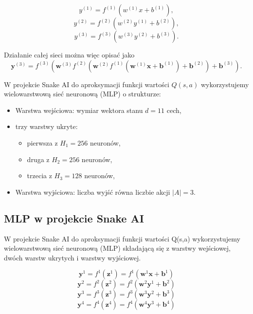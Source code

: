 \documentclass[a4paper,12pt]{article}
\begin{document}
\begin{equation}
y^{(1)} = f^{(1)}\left(w^{(1)}x + b^{(1)}\right), 
\end{equation}
\begin{equation}
y^{(2)} = f^{(2)}\left(w^{(2)}y^{(1)} + b^{(2)}\right), 
\end{equation}
\begin{equation}
y^{(3)} = f^{(3)}\left(w^{(3)}y^{(2)} + b^{(3)}\right).
\end{equation} 

Działanie całej sieci można więc opisać jako
\begin{equation}
\mathbf{y}^{(3)} = f^{(3)}\left( \mathbf{w}^{(3)} f^{(2)}\left( \mathbf{w}^{(2)} f^{(1)}\left( \mathbf{w}^{(1)} \mathbf{x} + \mathbf{b}^{(1)} \right) + \mathbf{b}^{(2)} \right) + \mathbf{b}^{(3)} \right).
\end{equation}

\cite{RZajdelMLP}



W projekcie Snake AI do aproksymacji funkcji wartości $Q(s,a)$ wykorzystujemy wielowarstwową sieć neuronową (MLP) o strukturze:

\begin{itemize}
\item Warstwa wejściowa: wymiar wektora stanu $d=11$ cech,
\item trzy warstwy ukryte:
\begin{itemize}
\item pierwsza z $H_1=256$ neuronów,
\item druga z $H_2=256$ neuronów,
\item trzecia z $H_3 = 128$ neuronów,
\end{itemize}
\item Warstwa wyjściowa: liczba wyjść równa liczbie akcji $|A|=3$.
\end{itemize}

\subsection{MLP w projekcie Snake AI}
W projekcie Snake AI do aproksymacji funkcji wartości Q(s,a) wykorzystujemy wielowarstwową sieć neuronową (MLP) składającą się z warstwy wejściowej, dwóch warstw ukrytych i warstwy wyjściowej. 

\begin{equation}
\mathbf{y}^{1} = f^{1}(\mathbf{z}^{1}) = f^{1}(\mathbf{w}^{1} \mathbf{x} + \mathbf{b}^{1}) 
\end{equation}
\begin{equation}
\mathbf{y}^{2} = f^{2}(\mathbf{z}^{2}) = f^{2}(\mathbf{w}^{2} \mathbf{y}^{1} + \mathbf{b}^{2}) 
\end{equation}
\begin{equation}
\mathbf{y}^{3} = f^{3}(\mathbf{z}^{3}) = f^{3}(\mathbf{w}^{3} \mathbf{y}^{2} + \mathbf{b}^{3}) 
\end{equation}
\begin{equation}
\mathbf{y}^{4} = f^{4}(\mathbf{z}^{4}) = f^{4}(\mathbf{w}^{4} \mathbf{y}^{3} + \mathbf{b}^{4})
\end{equation}
\end{document}
